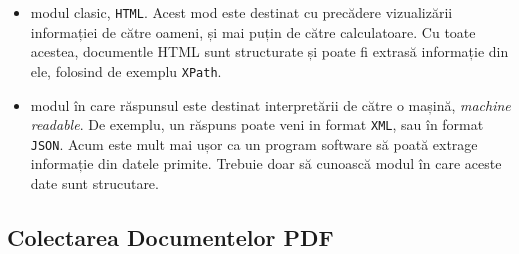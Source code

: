 \begin{itemize}
\item modul clasic, \texttt{HTML}. Acest mod este destinat cu precădere vizualizării informației de către oameni, și mai puțin de către calculatoare. Cu toate acestea, documentle HTML sunt structurate și poate fi extrasă informație din ele, folosind de exemplu \texttt{XPath}.


\item modul în care răspunsul este destinat interpretării de către o mașină, \textit{machine readable}. De exemplu, un răspuns poate veni in format \texttt{XML}, sau în format \texttt{JSON}. Acum este mult mai ușor ca un program software să poată extrage informație din datele primite. Trebuie doar să cunoască modul în care aceste date sunt strucutare.
\end{itemize}

\subsection{Colectarea Documentelor PDF}

